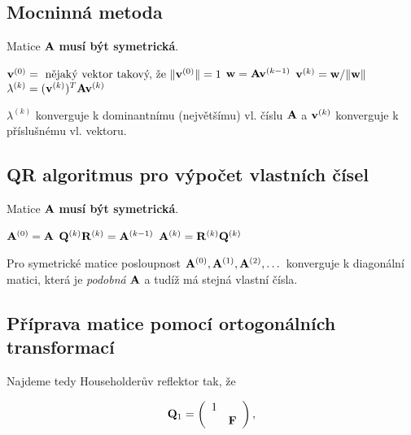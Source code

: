 \subsection*{Mocninná metoda}

Matice $\mathbf{A}$ \textbf{musí být symetrická}.

\vspace{0.5em}

\begin{algorithmic}
	\STATE $\mathbf{v}^{(0)} = \ \mbox{nějaký vektor takový, že} \ \|\mathbf{v}^{(0)}\| = 1$
	\STATE $\mathbf{w} = \mathbf{A}\mathbf{v}^{(k-1)}$
	\STATE $\mathbf{v}^{(k)} = \mathbf{w} / \|\mathbf{w}\|$
	\STATE $\lambda^{(k)} = (\mathbf{v}^{(k)})^T \mathbf{A}\mathbf{v}^{(k)}$
	\ENDFOR
\end{algorithmic}

\vspace{0.5em}

\noindent $\lambda^{(k)}$ konverguje k dominantnímu (největšímu) vl. číslu $\mathbf{A}$ a $\mathbf{v}^{(k)}$ konverguje k příslušnému vl. vektoru.

\subsection*{QR algoritmus pro výpočet vlastních čísel}

Matice $\mathbf{A}$ \textbf{musí být symetrická}.

\vspace{0.5em}

\begin{algorithmic}
	\STATE $\mathbf{A}^{(0)} = \mathbf{A}$
	\STATE $\mathbf{Q}^{(k)}\mathbf{R}^{(k)} = \mathbf{A}^{(k-1)}$
	\STATE $\mathbf{A}^{(k)} = \mathbf{R}^{(k)}\mathbf{Q}^{(k)}$
	\ENDFOR
\end{algorithmic}

\vspace{0.5em}

\noindent Pro symetrické matice posloupnost $\mathbf{A}^{(0)}, \mathbf{A}^{(1)}, \mathbf{A}^{(2)}, \dots$ konverguje k diagonální matici, která je \emph{podobná} $\mathbf{A}$ a tudíž má stejná vlastní čísla.

\subsection*{Příprava matice pomocí ortogonálních transformací}


Najdeme tedy Householderův reflektor tak, že

\[ \mQ_1 = \left( {\begin{array}{*{20}c} 1 &    \\ & \mF \end{array} } \right), \]

